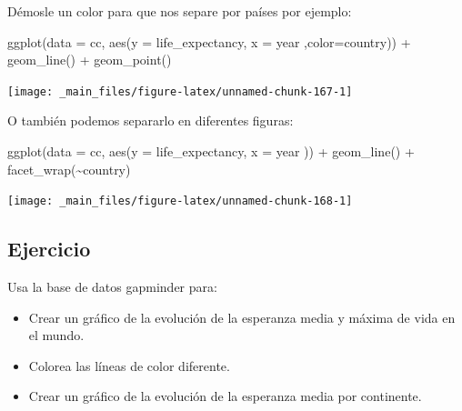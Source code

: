 \documentclass[
]{book}
\newenvironment{Shaded}{\begin{snugshade}}{\end{snugshade}}
\newcommand{\AttributeTok}[1]{\textcolor[rgb]{0.77,0.63,0.00}{#1}}
\newcommand{\FunctionTok}[1]{\textcolor[rgb]{0.00,0.00,0.00}{#1}}
\newcommand{\NormalTok}[1]{#1}
\newcommand{\SpecialCharTok}[1]{\textcolor[rgb]{0.00,0.00,0.00}{#1}}
\providecommand{\tightlist}{%
  \setlength{\itemsep}{0pt}\setlength{\parskip}{0pt}}
\begin{document}
Démosle un color para que nos separe por países por ejemplo:

\begin{Shaded}
\begin{Highlighting}[]
\FunctionTok{ggplot}\NormalTok{(}\AttributeTok{data =}\NormalTok{ cc, }\FunctionTok{aes}\NormalTok{(}\AttributeTok{y =}\NormalTok{ life\_expectancy, }\AttributeTok{x =}\NormalTok{ year ,}\AttributeTok{color=}\NormalTok{country)) }\SpecialCharTok{+}
  \FunctionTok{geom\_line}\NormalTok{() }\SpecialCharTok{+}
  \FunctionTok{geom\_point}\NormalTok{()}
\end{Highlighting}
\end{Shaded}

\begin{center}\texttt{[image: \_main\_files/figure-latex/unnamed-chunk-167-1]} \end{center}

O también podemos separarlo en diferentes figuras:

\begin{Shaded}
\begin{Highlighting}[]
\FunctionTok{ggplot}\NormalTok{(}\AttributeTok{data =}\NormalTok{ cc, }\FunctionTok{aes}\NormalTok{(}\AttributeTok{y =}\NormalTok{ life\_expectancy, }\AttributeTok{x =}\NormalTok{ year )) }\SpecialCharTok{+}
  \FunctionTok{geom\_line}\NormalTok{() }\SpecialCharTok{+}
  \FunctionTok{facet\_wrap}\NormalTok{(}\SpecialCharTok{\textasciitilde{}}\NormalTok{country)}
\end{Highlighting}
\end{Shaded}

\begin{center}\texttt{[image: \_main\_files/figure-latex/unnamed-chunk-168-1]} \end{center}

\hypertarget{ejercicio-2}{%
\subsection{Ejercicio}\label{ejercicio-2}}

Usa la base de datos gapminder para:

\begin{itemize}
\tightlist
\item
  Crear un gráfico de la evolución de la esperanza media y máxima de vida en el mundo.
\item
  Colorea las líneas de color diferente.
\item
  Crear un gráfico de la evolución de la esperanza media por continente.
\end{itemize}
\end{document}

